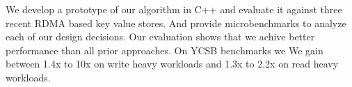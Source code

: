 
We develop a prototype of our algorithm in C++ and evaluate
it against three recent RDMA based key value stores. And
provide microbenchmarks to analyze each of our design
decisions. Our evaluation shows that we achive better
performance than all prior approaches. On YCSB benchmarks we
We gain between 1.4x to 10x on write heavy workloads and
1.3x to 2.2x on read heavy workloads. 
